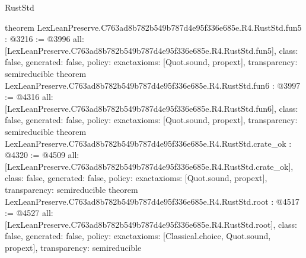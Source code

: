 \begin{lexlean}{RustStd}
\begin{coremodule}
{}
theorem LexLeanPreserve.C763ad8b782b549b787d4e95f336e685e.R4.RustStd.fun5 : @3216 := @3996 {
  all: [LexLeanPreserve.C763ad8b782b549b787d4e95f336e685e.R4.RustStd.fun5],
  class: false,
  generated: false,
  policy: exact{axioms: [Quot.sound, propext]},
  transparency: semireducible
}
theorem LexLeanPreserve.C763ad8b782b549b787d4e95f336e685e.R4.RustStd.fun6 : @3997 := @4316 {
  all: [LexLeanPreserve.C763ad8b782b549b787d4e95f336e685e.R4.RustStd.fun6],
  class: false,
  generated: false,
  policy: exact{axioms: [Quot.sound, propext]},
  transparency: semireducible
}
theorem LexLeanPreserve.C763ad8b782b549b787d4e95f336e685e.R4.RustStd.crate_ok : @4320 := @4509 {
  all: [LexLeanPreserve.C763ad8b782b549b787d4e95f336e685e.R4.RustStd.crate_ok],
  class: false,
  generated: false,
  policy: exact{axioms: [Quot.sound, propext]},
  transparency: semireducible
}
theorem LexLeanPreserve.C763ad8b782b549b787d4e95f336e685e.R4.RustStd.root : @4517 := @4527 {
  all: [LexLeanPreserve.C763ad8b782b549b787d4e95f336e685e.R4.RustStd.root],
  class: false,
  generated: false,
  policy: exact{axioms: [Classical.choice, Quot.sound, propext]},
  transparency: semireducible
}


\end{coremodule}
\end{lexlean}
